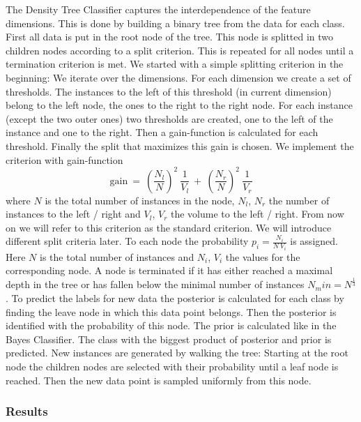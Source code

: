 \documentclass{article}
\begin{document}
The Density Tree Classifier captures the interdependence of the feature dimensions. This is done by 
building a binary tree from the data for each class.
First all data is put in the root node of the tree. This node is splitted in two children nodes according to a split criterion.
This is repeated for all nodes until a termination criterion is met.
\newline
We started with a simple splitting criterion in the beginning:
We iterate over the dimensions. For each dimension we create a set of thresholds. 
The instances to the left of this threshold (in current dimension) belong to the left node, the ones to 
the right to the right node. For each instance (except the two outer ones) two thresholds are created, one to the left
of the instance and one to the right.
Then a gain-function is calculated for each threshold. Finally the split that maximizes this gain is chosen.
We implement the criterion with gain-function
\begin{equation}
	\mathrm{gain} ~ = ~ ( \frac{N_l}{N} )^2 ~ \frac{1}{V_l} ~ +  ~ ( \frac{N_r}{N} )^2 ~ \frac{1}{V_r} 
\end{equation}
where $N$ is the total number of instances in the node, $N_l$, $N_r$ the number of instances to the left / right
and $V_l$, $V_r$ the volume to the left / right.
From now on we will refer to this criterion as the standard criterion. We will introduce different split 
criteria later.
\newline
To each node the probability $p_i = \frac{N_i}{N ~ V_i}$ is assigned. Here $N$ is the total number of instances
and $N_i$, $V_i$ the values for the corresponding node.
\newline
A node is terminated if it has either reached a maximal depth in the tree or has fallen below the minimal number
of instances $N_min = N^{\frac{1}{3}}$.
\newline
To predict the labels for new data the posterior is calculated for each class by finding the leave node in which this data point
belongs. Then the posterior is identified with the probability of this node. The prior is calculated like in the
Bayes Classifier. The class with the biggest product of posterior and prior is predicted.
\newline
New instances are generated by walking the tree: Starting at the root node the children nodes are selected with their
probability until a leaf node is reached. Then the new data point is sampled uniformly from this node.

\subsubsection{Results}
\end{document}
